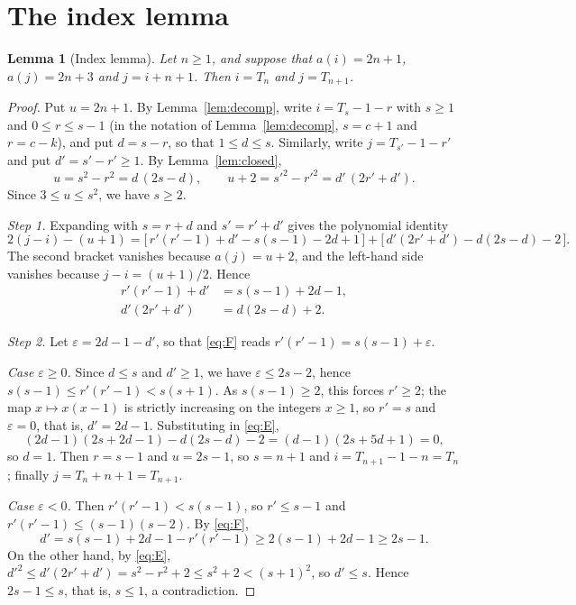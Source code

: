 \documentclass[11pt,a4paper]{article}
\theoremstyle{plain}
\newtheorem{lemma}[theorem]{Lemma}
\theoremstyle{remark}
\begin{document}
\section{The index lemma}\label{sec:lemma}

\begin{lemma}[Index lemma]\label{lem:index}
Let $n \ge 1$, and suppose that $a(i) = 2n+1$, $a(j) = 2n+3$ and $j = i+n+1$. Then
$i = T_n$ and $j = T_{n+1}$.
\end{lemma}

\begin{proof}
Put $u = 2n+1$. By Lemma~\ref{lem:decomp}, write $i = T_s - 1 - r$ with $s \ge 1$ and
$0 \le r \le s-1$ (in the notation of Lemma~\ref{lem:decomp}, $s = c+1$ and
$r = c-k$), and put $d = s-r$, so that $1 \le d \le s$. Similarly, write
$j = T_{s'} - 1 - r'$ and put $d' = s' - r' \ge 1$. By Lemma~\ref{lem:closed},
\[
  u = s^2 - r^2 = d\,(2s-d), \qquad u + 2 = s'^2 - r'^2 = d'\,(2r'+d').
\]
Since $3 \le u \le s^2$, we have $s \ge 2$.

\emph{Step 1.} Expanding with $s = r+d$ and $s' = r'+d'$ gives the polynomial identity
\[
  2(j-i) - (u+1) = \bigl[\, r'(r'-1) + d' - s(s-1) - 2d + 1 \,\bigr]
    + \bigl[\, d'(2r'+d') - d(2s-d) - 2 \,\bigr].
\]
The second bracket vanishes because $a(j) = u+2$, and the left-hand side vanishes
because $j - i = (u+1)/2$. Hence
\begin{align}
  r'(r'-1) + d' &= s(s-1) + 2d - 1, \tag{F}\label{eq:F}\\
  d'(2r'+d') &= d(2s-d) + 2. \tag{E}\label{eq:E}
\end{align}

\emph{Step 2.} Let $\varepsilon = 2d - 1 - d'$, so that \eqref{eq:F} reads
$r'(r'-1) = s(s-1) + \varepsilon$.

\emph{Case $\varepsilon \ge 0$.} Since $d \le s$ and $d' \ge 1$, we have
$\varepsilon \le 2s-2$, hence $s(s-1) \le r'(r'-1) < s(s+1)$. As $s(s-1) \ge 2$, this
forces $r' \ge 2$; the map $x \mapsto x(x-1)$ is strictly increasing on the integers
$x \ge 1$, so $r' = s$ and $\varepsilon = 0$, that is, $d' = 2d-1$. Substituting in
\eqref{eq:E},
\[
  (2d-1)(2s+2d-1) - d(2s-d) - 2 = (d-1)(2s+5d+1) = 0,
\]
so $d = 1$. Then $r = s-1$ and $u = 2s-1$, so $s = n+1$ and
$i = T_{n+1} - 1 - n = T_n$; finally $j = T_n + n + 1 = T_{n+1}$.

\emph{Case $\varepsilon < 0$.} Then $r'(r'-1) < s(s-1)$, so $r' \le s-1$ and
$r'(r'-1) \le (s-1)(s-2)$. By \eqref{eq:F},
\[
  d' = s(s-1) + 2d - 1 - r'(r'-1) \ge 2(s-1) + 2d - 1 \ge 2s - 1.
\]
On the other hand, by \eqref{eq:E},
$d'^2 \le d'(2r'+d') = s^2 - r^2 + 2 \le s^2 + 2 < (s+1)^2$, so $d' \le s$. Hence
$2s - 1 \le s$, that is, $s \le 1$, a contradiction.
\end{proof}
\end{document}
